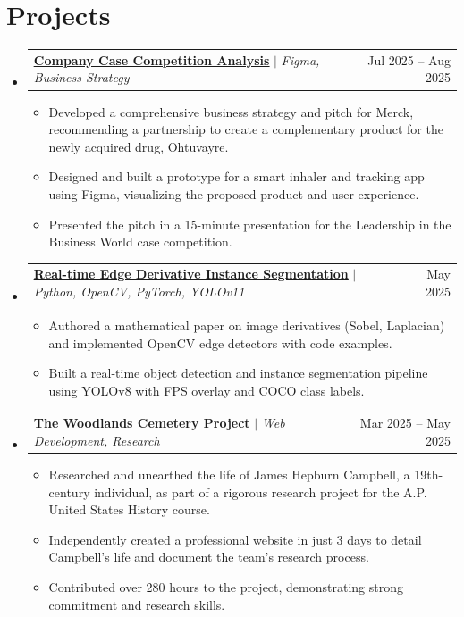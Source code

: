 \documentclass[letterpaper,11pt]{article}
\makeatletter
\newcommand{\resumeItem}[1]{
  \item\small{
    {#1 \vspace{-2pt}}
  }
}
\newcommand{\resumeProjectHeading}[2]{
    \item
    \begin{tabular*}{0.97\textwidth}{l@{\extracolsep{\fill}}r}
      \normalsize#1 & #2 \\
    \end{tabular*}\vspace{-7pt}
}
\newcommand{\resumeSubHeadingListStart}{\begin{itemize}[leftmargin=0.15in, label={}]}
\newcommand{\resumeSubHeadingListEnd}{\end{itemize}}
\newcommand{\resumeItemListStart}{\begin{itemize}}
\newcommand{\resumeItemListEnd}{\end{itemize}\vspace{-5pt}}
\makeatother
\begin{document}
\section{Projects}
    \resumeSubHeadingListStart
        \resumeProjectHeading
          {\textbf{\href{https://www.canva.com/design/DAGt7D0ei7M/Xnchay4z5OCWafSrfZjrlw/view?utm_content}{\underline{Company Case Competition Analysis}}} $|$ \emph{Figma, Business Strategy}}{Jul 2025 -- Aug 2025}
          \resumeItemListStart
            \resumeItem{Developed a comprehensive business strategy and pitch for Merck, recommending a partnership to create a complementary product for the newly acquired drug, Ohtuvayre.}
            \resumeItem{Designed and built a prototype for a smart inhaler and tracking app using Figma, visualizing the proposed product and user experience.}
            \resumeItem{Presented the pitch in a 15-minute presentation for the Leadership in the Business World case competition.}
          \resumeItemListEnd
        \resumeProjectHeading
          {\textbf{\href{https://github.com/li-valen/calc-final-project}{\underline{Real-time Edge Derivative Instance Segmentation}}} $|$ \emph{Python, OpenCV, PyTorch, YOLOv11}}{May 2025}
          \resumeItemListStart
            \resumeItem{Authored a mathematical paper on image derivatives (Sobel, Laplacian) and implemented OpenCV edge detectors with code examples.}
            \resumeItem{Built a real-time object detection and instance segmentation pipeline using YOLOv8 with FPS overlay and COCO class labels.}
          \resumeItemListEnd
        \resumeProjectHeading
          {\textbf{\href{https://james-h-campbell.vercel.app/}{\underline{The Woodlands Cemetery Project}}} $|$ \emph{Web Development, Research}}{Mar 2025 -- May 2025}
          \resumeItemListStart
            \resumeItem{Researched and unearthed the life of James Hepburn Campbell, a 19th-century individual, as part of a rigorous research project for the A.P. United States History course.}
            \resumeItem{Independently created a professional website in just 3 days to detail Campbell's life and document the team's research process.}
            \resumeItem{Contributed over 280 hours to the project, demonstrating strong commitment and research skills.}
          \resumeItemListEnd
    \resumeSubHeadingListEnd
%

\end{document}
